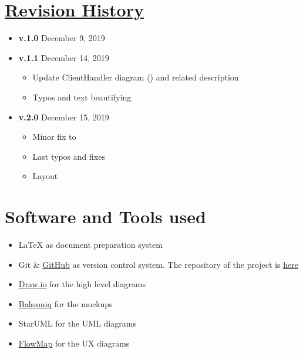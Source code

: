 \begin{appendices}
	\section[Revision History]{\hyperlink{toc}{Revision History}}
		\label{sec:revisionHistory}
		
		\begin{itemize}
			\item \textbf{v.1.0} December 9, 2019
			\item \textbf{v.1.1} December 14, 2019
				\begin{itemize}
					\item Update ClientHandler diagram () and related description
					
					\item Typos and text beautifying
				\end{itemize}
			\item \textbf{v.2.0} December 15, 2019
				\begin{itemize}
					\item Minor fix to 
					\item Last typos and fixes
					\item Layout
				\end{itemize}
		\end{itemize}
		
	\section{Software and Tools used}
		\label{sec:softwareAndTools}
		
		\begin{itemize}
			\item \LaTeX{} as document preparation system
			\item Git \& \href{https://github.com/}{GitHub} as version control system. The repository of the project is \href{https://github.com/Megapiro/PaccianiPiro}{here}
			\item \href{https://www.draw.io/}{Draw.io} for the high level diagrams
			\item \href{https://balsamiq.com/}{Balsamiq} for the mockups
			\item StarUML for the UML diagrams
			\item \href{https://flowmapp.com/}{FlowMap} for the UX diagrams
		\end{itemize}		
\end{appendices}